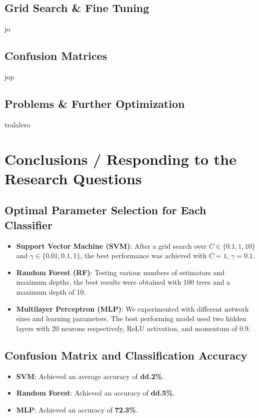 \documentclass[runningheads]{llncs}
\begin{document}
\subsection{Grid Search \& Fine Tuning}

jo
\subsection{Confusion Matrices}

jop
\subsection{Problems \& Further Optimization}
tralalero

\section{Conclusions / Responding to the Research Questions}

\subsection{Optimal Parameter Selection for Each Classifier}

\begin{itemize}
    \item \textbf{Support Vector Machine (SVM)}: 
    After a grid search over $C \in \{0.1, 1, 10\}$ and $\gamma \in \{0.01, 0.1, 1\}$, the best performance was achieved with $C=1$, $\gamma=0.1$.
    \item \textbf{Random Forest (RF)}: 
    Testing various numbers of estimators and maximum depths, the best results were obtained with 100 trees and a maximum depth of 10.
    \item \textbf{Multilayer Perceptron (MLP)}: 
    We experimented with different network sizes and learning parameters. The best performing model used two hidden layers with 20 neurons respectively, ReLU activation, and momentum of 0.9.
\end{itemize}

\subsection{Confusion Matrix and Classification Accuracy}

\begin{itemize}
    \item \textbf{SVM}: Achieved an average accuracy of \textbf{dd.2\%}.
    \item \textbf{Random Forest}: Achieved an accuracy of \textbf{dd.5\%}.
    \item \textbf{MLP}: Achieved an accuracy of \textbf{72.3\%}.
\end{itemize}
\end{document}
